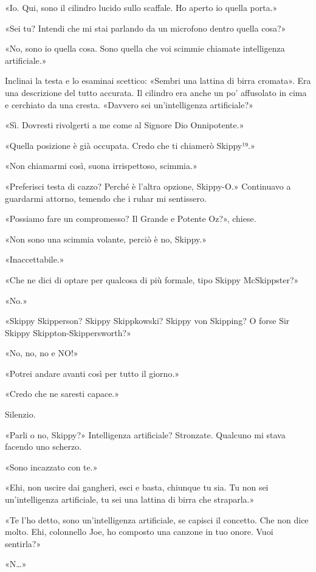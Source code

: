 «Io. Qui, sono il cilindro lucido sullo scaffale. Ho aperto io quella
porta.»

«Sei tu? Intendi che mi stai parlando da un microfono dentro quella
cosa?»

«No, sono io quella cosa. Sono quella che voi scimmie chiamate
intelligenza artificiale.»

Inclinai la testa e lo esaminai scettico: «Sembri una lattina di birra
cromata». Era una descrizione del tutto accurata. Il cilindro era anche
un po' affusolato in cima e cerchiato da una cresta. «Davvero sei
un'intelligenza artificiale?»

«Sì. Dovresti rivolgerti a me come al Signore Dio Onnipotente.»

«Quella posizione è già occupata. Credo che ti chiamerò Skippy¹⁹.»

«Non chiamarmi così, suona irrispettoso, scimmia.»

«Preferisci testa di cazzo? Perché è l'altra opzione, Skippy-O.»
Continuavo a guardarmi attorno, temendo che i ruhar mi sentissero.

«Possiamo fare un compromesso? Il Grande e Potente Oz?», chiese.

«Non sono una scimmia volante, perciò è no, Skippy.»

«Inaccettabile.»

«Che ne dici di optare per qualcosa di più formale, tipo Skippy
McSkippster?»

«No.»

«Skippy Skipperson? Skippy Skippkowski? Skippy von Skipping? O forse Sir
Skippy Skippton-Skippersworth?»

«No, no, no e NO!»

«Potrei andare avanti così per tutto il giorno.»

«Credo che ne saresti capace.»

Silenzio.

«Parli o no, Skippy?» Intelligenza artificiale? Stronzate. Qualcuno mi
stava facendo uno scherzo.

«Sono incazzato con te.»

«Ehi, non uscire dai gangheri, esci e basta, chiunque tu sia. Tu non sei
un'intelligenza artificiale, tu sei una lattina di birra che straparla.»

«Te l'ho detto, sono un'intelligenza artificiale, se capisci il
concetto. Che non dice molto. Ehi, colonnello Joe, ho composto una
canzone in tuo onore. Vuoi sentirla?»

«N\ldots»

